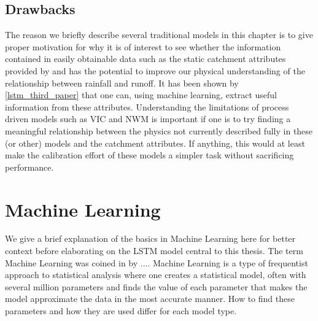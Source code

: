 \subsection{Drawbacks}
The reason we briefly describe several traditional models in this chapter is to 
give proper motivation for why it is of interest to see whether the information 
contained in easily obtainable data such as the static catchment attributes 
provided by \cite{CAMELS_US} and \cite{CAMELS_GB} has the potential to improve 
our physical understanding of the relationship between rainfall and runoff. It has 
been shown by \ref{lstm_third_paper} that one can, using machine learning, extract 
useful information from these attributes. Understanding the limitations of process 
driven models such as VIC and NWM is important if one is to try finding a 
meaningful relationship between the physics not currently described fully in these 
(or other) models and the catchment attributes. If anything, this would at least 
make the calibration effort of these models a simpler task without sacrificing 
performance.


\section{Machine Learning}
We give a brief explanation of the basics in Machine Learning here for better context 
before elaborating on the LSTM model central to this thesis.
The term Machine Learning was coined in \citationneeded by .... 
Machine Learning is a type of frequentist approach to statistical analysis where 
one creates a statistical model, often with several million parameters and finds 
the value of each parameter that makes the model approximate the data in the most 
accurate manner. How to find these parameters and how they are used differ for each 
model type. 
